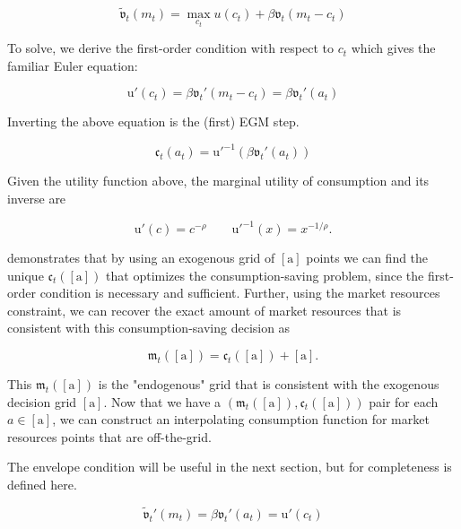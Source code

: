 \documentclass{article}
\newcommand{\DiscFac}{\beta}
\newcommand{\utilFunc}{\mathrm{u}}
\newcommand{\util}{u}
\newcommand{\CRRA}{\rho}
\newcommand{\cRat}{c}
\newcommand{\aRat}{a}
\newcommand{\mRat}{m}
\newcommand{\vOpt}{\tilde{\mathfrak{v}}}
\newcommand{\vEnd}{\mathfrak{v}}
\newcommand{\cEndFunc}{\mathfrak{c}}
\newcommand{\xRat}{x}
\newcommand{\aMat}{[\mathrm{a}]}
\newcommand{\mEndFunc}{\mathfrak{m}}
\begin{document}
\begin{equation}
\vOpt_{t}(\mRat_{t}) = \max_{\cRat_{t}} \util(\cRat_{t}) +
  \DiscFac \vEnd_{t}(\mRat_{t}-\cRat_{t})
\end{equation}

To solve, we derive the first-order condition with respect to $\cRat_{t}$ which gives the familiar Euler equation:

\begin{equation}
\utilFunc'(\cRat_t) = \DiscFac \vEnd_{t}'(\mRat_{t} - \cRat_{t}) = \DiscFac
  \vEnd_{t}'(\aRat_{t})
\end{equation}

Inverting the above equation is the (first) EGM step.

\begin{equation}
\cEndFunc_{t}(\aRat_{t}) = \utilFunc'^{-1}\left( \DiscFac \vEnd_{t}'(\aRat_{t})
  \right)
\end{equation}

Given the utility function above, the marginal utility of consumption and its inverse are

\begin{equation}
\utilFunc'(\cRat) = \cRat^{-\CRRA} \qquad \utilFunc'^{-1}(\xRat) =
  \xRat^{-1/\CRRA}.
\end{equation}

\citet{Carroll2006} demonstrates that by using an exogenous grid of $\aMat$ points we can find the unique
$\cEndFunc_{t}(\aMat)$ that optimizes the consumption-saving problem, since the first-order condition is necessary and sufficient.
Further, using the market resources constraint, we can recover the exact amount
of market resources that is consistent with this consumption-saving decision as

\begin{equation}
\mEndFunc_{t}(\aMat) = \cEndFunc_{t}(\aMat) + \aMat.
\end{equation}

This $\mEndFunc_{t}(\aMat)$ is the "endogenous" grid that is consistent
with the exogenous decision grid $\aMat$. Now that we have a
$(\mEndFunc_{t}(\aMat), \cEndFunc_{t}(\aMat))$ pair for each
$\aRat \in \aMat$, we can construct an interpolating consumption function for
market resources points that are off-the-grid.

The envelope condition will be useful in the next section, but for completeness
is defined here.

\begin{equation}
\vOpt_{t}'(\mRat_{t}) = \DiscFac \vEnd_{t}'(\aRat_{t}) = \utilFunc'(\cRat_{t})
\end{equation}
\end{document}
